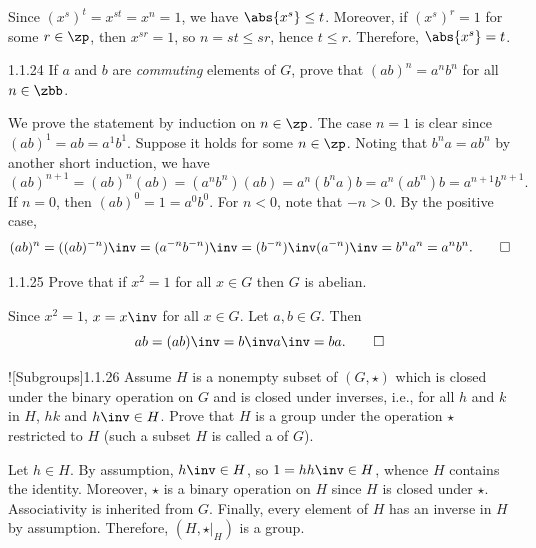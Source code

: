 \begin{sol}
    Since $(x^s)^t = x^{st} = x^n = 1$, we have $\abs{x^s} \leq t$.
	Moreover, if $(x^s)^r = 1$ for some $r \in \zp$, then $x^{sr} = 1$, so $n = st \leq sr$, hence $t \leq r$.
	Therefore, $\abs{x^s} = t$.
\end{sol}

\begin{exercise}{1.1.24}
    If $a$ and $b$ are \emph{commuting} elements of $G$, prove that $(ab)^n = a^n b^n$ for all $n \in \zbb$. 
\end{exercise}

\begin{sol}
    We prove the statement by induction on $n \in \zp$.
    The case $n = 1$ is clear since $(ab)^1 = ab = a^1 b^1$.
    Suppose it holds for some $n \in \zp$.
    Noting that $b^n a = a b^n$ by another short induction, we have
    \[
        (ab)^{n+1} = (ab)^n (ab) = (a^n b^n)(ab) = a^n (b^n a) b = a^n (ab^n) b = a^{n+1} b^{n+1}.
    \]
    If $n = 0$, then $(ab)^0 = 1 = a^0 b^0$.
    For $n < 0$, note that $-n > 0$.
    By the positive case,
    \[
        (ab)^n = ((ab)^{-n})\inv = (a^{-n} b^{-n})\inv = (b^{-n})\inv (a^{-n})\inv = b^n a^n = a^n b^n. \qedhere
    \]
\end{sol}

\begin{exercise}{1.1.25}
    Prove that if $x^2 = 1$ for all $x \in G$ then $G$ is abelian.
\end{exercise}

\begin{sol}
    Since $x^2 = 1$, $x = x\inv$ for all $x \in G$.
	Let $a, b \in G$.
	Then
    \[
    	ab = (ab)\inv = b\inv a\inv = ba. \qedhere
    \]
\end{sol}

\begin{exercise}![Subgroups]{1.1.26}
    Assume $H$ is a nonempty subset of $(G, \star)$ which is closed under the binary operation on $G$ and is closed under inverses, i.e., for all $h$ and $k$ in $H$, $hk$ and  $h\inv \in H$.
	Prove that $H$ is a group under the operation $\star$ restricted to $H$ (such a subset $H$ is called a  of $G$).
\end{exercise}

\begin{sol}
    Let $h \in H$.
    By assumption, $h\inv \in H$, so $1 = h h\inv \in H$, whence $H$ contains the identity.
    Moreover, $\star$ is a binary operation on $H$ since $H$ is closed under $\star$.
    Associativity is inherited from $G$.
    Finally, every element of $H$ has an inverse in $H$ by assumption.
    Therefore, $(H, \star|_H)$ is a group.
\end{sol}

